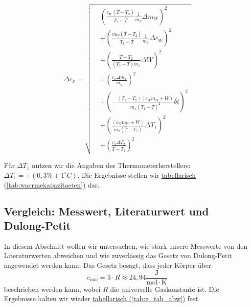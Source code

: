 \begin{equation}
    \Delta c_x = 
    \sqrt{ 
    \begin{aligned}
    &   \left( \frac{c_W ( \overline{T} - T_2)}{T_1 - \overline{T}} \frac{1}{m_x} \Delta m_W \right)^2 \\
    & + \left( \frac{m_W (\overline{T} - T_2)}{T_1 - \overline{T}} \frac{1}{m_x} \Delta c_W \right)^2 \\
    & + \left( \frac{\overline{T} - T_2}{(T_1 - \overline{T}) m_x} \Delta W \right)^2 \\
    & + \left( \frac{c_x \Delta m_x}{m_x} \right)^2 \\
    & + \left( - \frac{(T_1 - T_2)(c_W m_W + W)}{m_x (T_1 - \overline{T})^2} \overline{\delta t} \right)^2 \\
    & + \left( \frac{(c_W m_W + W)}{m_x (\overline{T} - T_2)} \Delta T_1 \right)^2 \\
    & + \left( \frac{c_x \Delta T_2}{\overline{T} - T_2} \right)^2
    \end{aligned}
    }
    \label{eq:deltacx}
\end{equation}

Für $\Delta T_1$ nutzen wir die Angaben des Thermometerherstellers: $\Delta T_1 = \pm(0,3\% + 1^\circ C)$.
Die Ergebnisse stellen wir \hyperref[tab:waermekapazitaeten]{tabellarisch (\ref*{tab:waermekapazitaeten})} dar.

\subsection*{Vergleich: Messwert, Literaturwert und Dulong-Petit}
In diesem Abschnitt wollen wir untersuchen, wie stark unsere Messwerte von den Literaturwerten abweichen und wie zuverlässig das Gesetz von Dulong-Petit angewendet werden kann.
Das Gesetz besagt, dass jeder Körper über
\begin{equation}
    c_\mathrm{mol} = 3 \cdot R \approx 24,94 \frac{\mathrm{J}}{\mathrm{mol \cdot K}}
\end{equation}
beschrieben werden kann, wobei $R$ die universelle Gaskonstante ist. Die Ergebnisse halten wir wieder \hyperref[tab:e_tab_abw]{tabellarisch (\ref*{tab:e_tab_abw})} fest.

